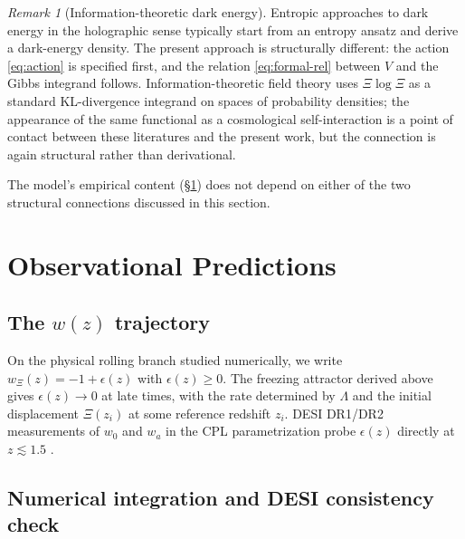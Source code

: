 \documentclass[11pt,reqno]{amsart}
\theoremstyle{plain}
\theoremstyle{definition}
\theoremstyle{remark}
\newtheorem*{remark}{Remark}
\begin{document}
\begin{remark}[Information-theoretic dark energy]
Entropic approaches to dark energy in the holographic sense
\cite{Verlinde2011,CHLZ2012} typically start from an entropy ansatz
and derive a dark-energy density. The present approach is structurally
different: the action \eqref{eq:action} is specified first, and the
relation \eqref{eq:formal-rel} between $V$ and the Gibbs integrand
follows. Information-theoretic field theory \cite{Ensslin2013,Caticha2012}
uses $\Xi\log\Xi$ as a standard KL-divergence integrand on spaces of
probability densities; the appearance of the same functional as a
cosmological self-interaction is a point of contact between these
literatures and the present work, but the connection is again
structural rather than derivational.
\end{remark}

The model's empirical content (\S\ref{sec:obs}) does not depend on either
of the two structural connections discussed in this section.

\section{Observational Predictions}\label{sec:obs}

\subsection{The $w(z)$ trajectory}

On the physical rolling branch studied numerically, we write
$w_\Xi(z) = -1 + \epsilon(z)$ with $\epsilon(z) \geq 0$. The freezing
attractor derived above gives $\epsilon(z) \to 0$ at late times, with
the rate determined by $\Lambda$ and the initial displacement $\Xi(z_i)$
at some reference redshift $z_i$. DESI DR1/DR2 measurements of $w_0$
and $w_a$ in the CPL parametrization probe $\epsilon(z)$ directly at
$z \lesssim 1.5$ \cite{DESI2024BAO,DESI2024VI}.

\subsection{Numerical integration and DESI consistency check}\label{sec:desifit}
\end{document}

